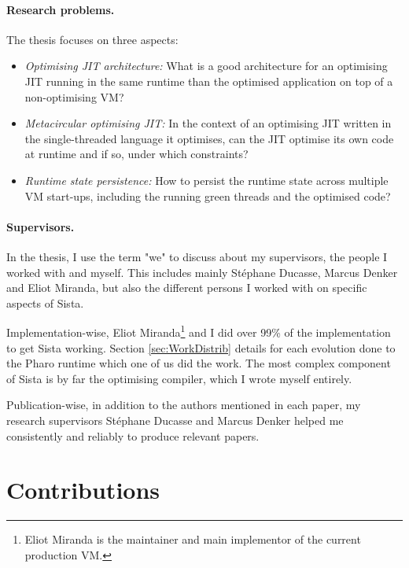 \documentclass[a4paper,12pt,twoside]{../includes/ThesisStyle}
\begin{document}
\paragraph{Research problems.}The thesis focuses on three aspects:
\begin{itemize}
	\item \emph{Optimising JIT architecture:} {What is a good architecture for an optimising JIT running in the same runtime than the optimised application on top of a non-optimising VM?}
	\item \emph{Metacircular optimising JIT:} In the context of an optimising JIT written in the single-threaded language it optimises, can the JIT optimise its own code at runtime and if so, under which constraints?
	\item \emph{Runtime state persistence:} How to persist the runtime state across multiple VM start-ups, including the running green threads and the optimised code?
\end{itemize}

\paragraph{Supervisors.} In the thesis, I use the term "we" to discuss about my supervisors, the people I worked with and myself. This includes mainly St\'ephane Ducasse, Marcus Denker and Eliot Miranda, but also the different persons I worked with on specific aspects of Sista.

Implementation-wise, Eliot Miranda\footnote{Eliot Miranda is the maintainer and main implementor of the current production VM.} and I did over 99\% of the implementation to get Sista working. Section \ref{sec:WorkDistrib} details for each evolution done to the Pharo runtime which one of us did the work. The most complex component of Sista is by far the optimising compiler, which I wrote myself entirely.

Publication-wise, in addition to the authors mentioned in each paper, my research supervisors St\'ephane Ducasse and Marcus Denker helped me consistently and reliably to produce relevant papers.

\section{Contributions}
\end{document}
